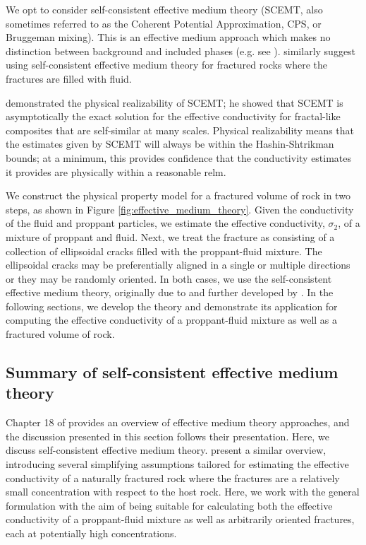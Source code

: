 We opt to consider self-consistent effective medium theory (SCEMT, also sometimes referred to as the Coherent Potential Approximation, CPS, or Bruggeman mixing). This is an effective medium approach which makes no distinction between background and included phases (e.g. see \cite{Torquato2002}). \cite{Berryman2013} similarly suggest using self-consistent effective medium theory for fractured rocks where the fractures are filled with fluid.

\cite{Milton1985} demonstrated the physical realizability of SCEMT; he showed that SCEMT is asymptotically the exact solution for the effective conductivity for fractal-like composites that are self-similar at many scales. Physical realizability means that the estimates given by SCEMT will always be within the Hashin-Shtrikman bounds; at a minimum, this provides confidence that the conductivity estimates it provides are physically within a reasonable relm.

We construct the physical property model for a fractured volume of rock in two steps, as shown in Figure \ref{fig:effective_medium_theory}. Given the conductivity of the fluid and proppant particles, we estimate the effective conductivity, $\sigma_2$, of a mixture of proppant and fluid. Next, we treat the fracture as consisting of a collection of ellipsoidal cracks filled with the proppant-fluid mixture. The ellipsoidal cracks may be preferentially aligned in a single or multiple directions or they may be randomly oriented. In both cases, we use the self-consistent effective medium theory, originally due to \cite{Bruggeman1935} and further developed by \cite{Landauer1952, Landauer1978}. In the following sections, we develop the theory and demonstrate its application for computing the effective conductivity of a proppant-fluid mixture as well as a fractured volume of rock.





\subsection{Summary of self-consistent effective medium theory}
\label{sect:emt_math}

Chapter 18 of \cite{Torquato2002} provides an overview of effective medium theory approaches, and the discussion presented in this section follows their presentation. Here, we discuss self-consistent effective medium theory. \cite{Berryman2013} present a similar overview, introducing several simplifying assumptions tailored for estimating the effective conductivity of a naturally fractured rock where the fractures are a relatively small concentration with respect to the host rock. Here, we work with the general formulation with the aim of being suitable for calculating both the effective conductivity of a proppant-fluid mixture as well as arbitrarily oriented fractures, each at potentially high concentrations.

